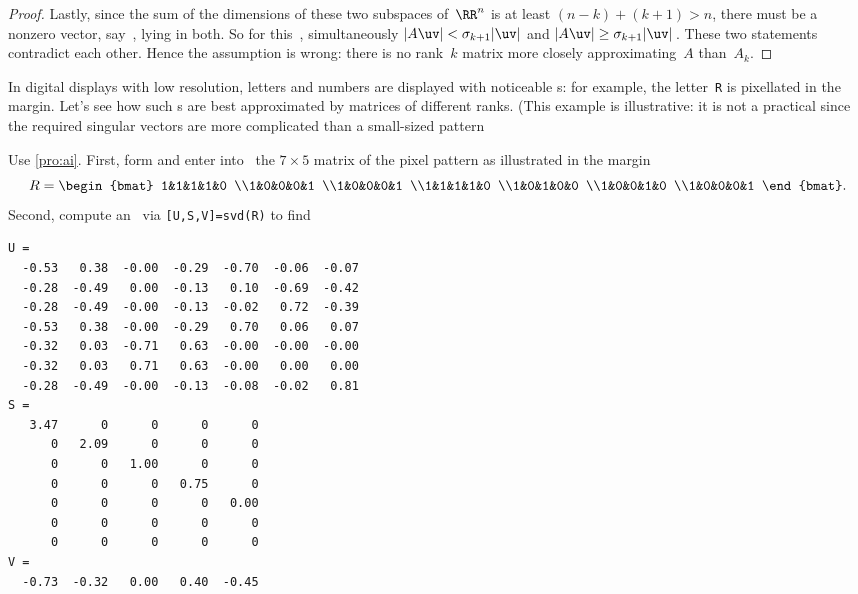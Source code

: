 \begin{proof}
Lastly, since the sum of the dimensions of these two subspaces of~\(\RR^n\) is at least \((n-k)+(k+1)>n\), there must be a nonzero vector, say~\uv, lying in both.
So for this~\uv, simultaneously \(|A\uv|<\sigma_{k+1}|\uv|\) and \(|A\uv|\geq\sigma_{k+1}|\uv|\)\,.
These two statements contradict each other.
Hence the assumption is wrong: there is no rank~\(k\) matrix more closely approximating~\(A\) than~\(A_k\).
\end{proof}



\begin{example} 
In digital displays with low resolution, letters and numbers are displayed with noticeable s: for example, the letter~\verb|R| is pixellated in the margin.
\marginpar{}%
Let's see how such s are best approximated by matrices of different ranks.
(This example is illustrative: it is not a practical  since the required singular vectors are more complicated than a small-sized pattern 
\begin{solution} 
Use \cref{pro:ai}.
First, form and enter into \script\ the \(7\times5\) matrix of the pixel pattern as illustrated in the margin
\begin{equation*}
R=\begin{bmat} 1&1&1&1&0
\\1&0&0&0&1
\\1&0&0&0&1
\\1&1&1&1&0
\\1&0&1&0&0
\\1&0&0&1&0
\\1&0&0&0&1 \end{bmat}.
\end{equation*}
Second, compute an \svd\ via \verb|[U,S,V]=svd(R)| to find \twodp
\begin{verbatim}
U =
  -0.53   0.38  -0.00  -0.29  -0.70  -0.06  -0.07
  -0.28  -0.49   0.00  -0.13   0.10  -0.69  -0.42
  -0.28  -0.49  -0.00  -0.13  -0.02   0.72  -0.39
  -0.53   0.38  -0.00  -0.29   0.70   0.06   0.07
  -0.32   0.03  -0.71   0.63  -0.00  -0.00  -0.00
  -0.32   0.03   0.71   0.63  -0.00   0.00   0.00
  -0.28  -0.49  -0.00  -0.13  -0.08  -0.02   0.81
S =
   3.47      0      0      0      0
      0   2.09      0      0      0
      0      0   1.00      0      0
      0      0      0   0.75      0
      0      0      0      0   0.00
      0      0      0      0      0
      0      0      0      0      0
V =
  -0.73  -0.32   0.00   0.40  -0.45

\end{verbatim}
\end{solution}
\end{example}
